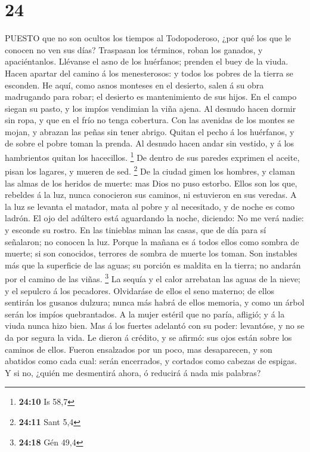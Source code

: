 \hypertarget{section-23}{%
\section{24}\label{section-23}}

 PUESTO que no son ocultos los tiempos al Todopoderoso, ¿por
qué los que le conocen no ven sus días?  Traspasan los
términos, roban los ganados, y apaciéntanlos.  Llévanse el
asno de los huérfanos; prenden el buey de la viuda.  Hacen
apartar del camino á los menesterosos: y todos los pobres de la tierra
se esconden.  He aquí, como asnos monteses en el desierto,
salen á su obra madrugando para robar; el desierto es mantenimiento de
sus hijos.  En el campo siegan su pasto, y los impíos
vendimian la viña ajena.  Al desnudo hacen dormir sin ropa,
y que en el frío no tenga cobertura.  Con las avenidas de
los montes se mojan, y abrazan las peñas sin tener abrigo. 
Quitan el pecho á los huérfanos, y de sobre el pobre toman la prenda.
 Al desnudo hacen andar sin vestido, y á los hambrientos
quitan los hacecillos. \footnote{\textbf{24:10} Is 58,7} 
De dentro de sus paredes exprimen el aceite, pisan los lagares, y mueren
de sed. \footnote{\textbf{24:11} Sant 5,4}  De la ciudad
gimen los hombres, y claman las almas de los heridos de muerte: mas Dios
no puso estorbo.  Ellos son los que, rebeldes á la luz,
nunca conocieron sus caminos, ni estuvieron en sus veredas.
 A la luz se levanta el matador, mata al pobre y al
necesitado, y de noche es como ladrón.  El ojo del adúltero
está aguardando la noche, diciendo: No me verá nadie: y esconde su
rostro.  En las tinieblas minan las casas, que de día para
sí señalaron; no conocen la luz.  Porque la mañana es á
todos ellos como sombra de muerte; si son conocidos, terrores de sombra
de muerte los toman.  Son instables más que la superficie
de las aguas; su porción es maldita en la tierra; no andarán por el
camino de las viñas. \footnote{\textbf{24:18} Gén 49,4}  La
sequía y el calor arrebatan las aguas de la nieve; y el sepulcro á los
pecadores.  Olvidaráse de ellos el seno materno; de ellos
sentirán los gusanos dulzura; nunca más habrá de ellos memoria, y como
un árbol serán los impíos quebrantados.  A la mujer estéril
que no paría, afligió; y á la viuda nunca hizo bien.  Mas á
los fuertes adelantó con su poder: levantóse, y no se da por segura la
vida.  Le dieron á crédito, y se afirmó: sus ojos están
sobre los caminos de ellos.  Fueron ensalzados por un poco,
mas desaparecen, y son abatidos como cada cual: serán encerrados, y
cortados como cabezas de espigas.  Y si no, ¿quién me
desmentirá ahora, ó reducirá á nada mis palabras?

